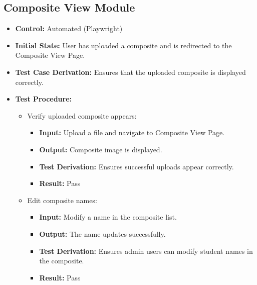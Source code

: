 \documentclass[12pt, titlepage]{article}
\begin{document}
\subsection{Composite View Module}
\begin{itemize}
    \item \textbf{Control: }Automated (Playwright)
    \item \textbf{Initial State: }User has uploaded a composite and is redirected to the Composite View Page.
    \item \textbf{Test Case Derivation: }Ensures that the uploaded composite is displayed correctly.
    \item \textbf{Test Procedure: }
    \begin{itemize}
        \item Verify uploaded composite appears:
        \begin{itemize}
            \item \textbf{Input: }Upload a file and navigate to Composite View Page.
            \item \textbf{Output: }Composite image is displayed.
            \item \textbf{Test Derivation: }Ensures successful uploads appear correctly.
            \item \textbf{Result: }Pass
        \end{itemize}
        \item Edit composite names:
        \begin{itemize}
            \item \textbf{Input: }Modify a name in the composite list.
            \item \textbf{Output: }The name updates successfully.
            \item \textbf{Test Derivation: }Ensures admin users can modify student names in the composite.
            \item \textbf{Result: }Pass
        \end{itemize}
    \end{itemize}
\end{itemize}
\end{document}

